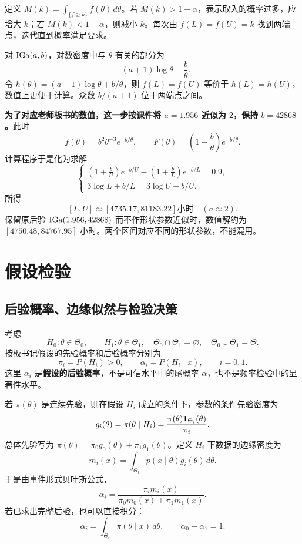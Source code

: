 定义 $M(k)=\int_{\{f\geq k\}}f(\theta)\,d\theta$。若 $M(k)>1-\alpha$，表示取入的概率过多，应增大 $k$；若 $M(k)<1-\alpha$，则减小 $k$。每次由 $f(L)=f(U)=k$ 找到两端点，迭代直到概率满足要求。

对 $\operatorname{IGa}(a,b)$，对数密度中与 $\theta$ 有关的部分为
\[
-(a+1)\log\theta-\frac b\theta.
\]
令 $h(\theta)=(a+1)\log\theta+b/\theta$，则 $f(L)=f(U)$ 等价于 $h(L)=h(U)$，数值上更便于计算。众数 $b/(a+1)$ 位于两端点之间。

\textbf{为了对应老师板书的数值，这一步按课件将 $a=1.956$ 近似为 $2$，保持 $b=42868$。}此时
\[
f(\theta)=b^2\theta^{-3}e^{-b/\theta},\qquad
F(\theta)=\left(1+\frac b\theta\right)e^{-b/\theta}.
\]
计算程序于是化为求解
\[
\begin{cases}
\displaystyle\left(1+\frac bU\right)e^{-b/U}
-\left(1+\frac bL\right)e^{-b/L}=0.9,\\
3\log L+b/L=3\log U+b/U.
\end{cases}
\]
所得
\[
\boxed{[L,U]\approx[4735.17,81183.22]\text{小时}\quad(a\approx2).}
\]
保留原后验 $\operatorname{IGa}(1.956,42868)$ 而不作形状参数近似时，数值解约为 $[4750.48,84767.95]$ 小时。两个区间对应不同的形状参数，不能混用。

\section{假设检验}
\subsection{后验概率、边缘似然与检验决策}
考虑
\[
H_0:\theta\in\Theta_0,\qquad H_1:\theta\in\Theta_1,
\quad\Theta_0\cap\Theta_1=\varnothing,\quad\Theta_0\cup\Theta_1=\Theta.
\]
按板书记假设的先验概率和后验概率分别为
\[
\pi_i=P(H_i)>0,\qquad \alpha_i=P(H_i\mid x),\qquad i=0,1.
\]
这里 $\alpha_i$ 是\textbf{假设的后验概率}，不是可信水平中的尾概率 $\alpha$，也不是频率检验中的显著性水平。

若 $\pi(\theta)$ 是连续先验，则在假设 $H_i$ 成立的条件下，参数的条件先验密度为
\[
g_i(\theta)=\pi(\theta\mid H_i)
=\frac{\pi(\theta)\mathbf{1}_{\Theta_i}(\theta)}{\pi_i}.
\]
总体先验写为 $\pi(\theta)=\pi_0g_0(\theta)+\pi_1g_1(\theta)$。定义 $H_i$ 下数据的边缘密度为
\[
m_i(x)=\int_{\Theta_i}p(x\mid\theta)g_i(\theta)\,d\theta.
\]
于是由事件形式贝叶斯公式，
\[
\boxed{\alpha_i=\frac{\pi_i m_i(x)}{\pi_0m_0(x)+\pi_1m_1(x)}.}
\]
若已求出完整后验，也可以直接积分：
\[
\alpha_i=\int_{\Theta_i}\pi(\theta\mid x)\,d\theta,\qquad
\alpha_0+\alpha_1=1.
\]

